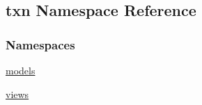 \hypertarget{namespacetxn}{}\subsection{txn Namespace Reference}
\label{namespacetxn}
\subsubsection*{Namespaces}
\begin{DoxyCompactItemize}
\item 
 \hyperlink{namespacetxn_1_1models}{models}
\item 
 \hyperlink{namespacetxn_1_1views}{views}
\end{DoxyCompactItemize}
